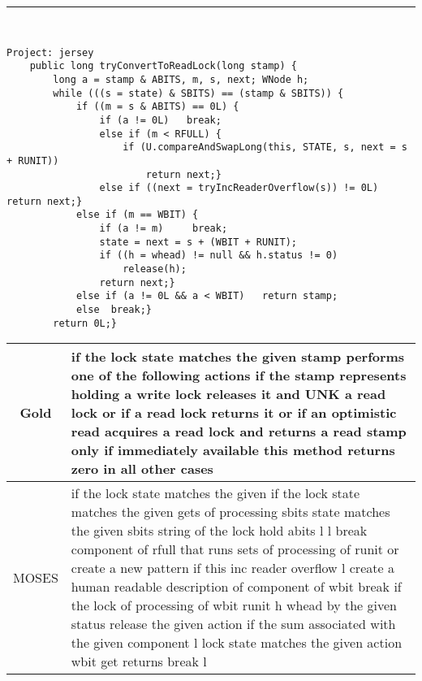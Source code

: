 \begin{figure*}[!htb]
\centering
\scriptsize{
\rule{\linewidth}{0.3mm}
\\[0.2cm]
\begin{minipage}{0.48\linewidth}
\centering
\hspace{.2cm}
\begin{lstlisting}
Project: jersey
    public long tryConvertToReadLock(long stamp) {
        long a = stamp & ABITS, m, s, next; WNode h;
        while (((s = state) & SBITS) == (stamp & SBITS)) {
            if ((m = s & ABITS) == 0L) {
                if (a != 0L)   break;
                else if (m < RFULL) {
                    if (U.compareAndSwapLong(this, STATE, s, next = s + RUNIT))
                        return next;}
                else if ((next = tryIncReaderOverflow(s)) != 0L) return next;}
            else if (m == WBIT) {
                if (a != m)     break;
                state = next = s + (WBIT + RUNIT);
                if ((h = whead) != null && h.status != 0)
                    release(h);
                return next;}
            else if (a != 0L && a < WBIT)   return stamp;
            else  break;}
        return 0L;}
\end{lstlisting}
\end{minipage}
 \hfill
\begin{minipage}{0.48\linewidth}
\begin{tabular}{|c|p{}|}
 \hline
   {Gold} & if the lock state matches the given stamp performs one of the following actions if the stamp represents holding a write lock releases it and UNK a read lock or if a read lock returns it or if an optimistic read acquires a read lock and returns a read stamp only if immediately available this method returns zero in all other cases\\
 \hline
   {MOSES} & if the lock state matches the given if the lock state matches the given gets of processing sbits state matches the given sbits string of the lock hold abits l l break component of rfull that runs sets of processing of runit or create a new pattern if this inc reader overflow l create a human readable description of component of wbit break if the lock of processing of wbit runit h whead by the given status release the given action if the sum associated with the given component l lock state matches the given action wbit get returns break l

\end{tabular}
\end{minipage}}
\end{figure*}
